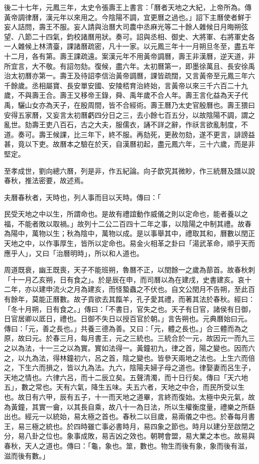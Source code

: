 \begin{pinyinscope}
後二十七年，元鳳三年，太史令張壽王上書言：「曆者天地之大紀，上帝所為。傳黃帝調律曆，漢元年以來用之。今陰陽不調，宜更曆之過也。」詔下主曆使者鮮于妄人詰問，壽王不服。妄人請與治曆大司農中丞麻光等二十餘人雜候日月晦朔弦望、八節二十四氣，鈞校諸曆用狀。奏可。詔與丞相、御史、大將軍、右將軍史各一人雜候上林清臺，課諸曆疏密，凡十一家。以元鳳三年十一月朔旦冬至，盡五年十二月，各有第。壽王課疏遠。案漢元年不用黃帝調曆，壽王非漢曆，逆天道，非所宜言，大不敬。有詔勿劾。復候，盡六年。太初曆第一，即墨徐萬且、長安徐禹治太初曆亦第一。壽王及待詔李信治黃帝調曆，課皆疏闊，又言黃帝至元鳳三年六千餘歲。丞相屬寶、長安單安國、安陵桮育治終始，言黃帝以來三千六百二十九歲，不與壽王合。壽王又移帝王錄，舜、禹年歲不合人年。壽王言化益為天子代禹，驪山女亦為天子，在殷周間，皆不合經術。壽王曆乃太史官殷曆也。壽王猥曰安得五家曆，又妄言太初曆虧四分日之三，去小餘七百五分，以故陰陽不調，謂之亂世。劾壽王吏八百石，古之大夫，服儒衣，誦不詳之辭，作祅言欲亂制度，不道。奏可。壽王候課，比三年下，終不服。再劾死，更赦勿劾，遂不更言，誹謗益甚，竟以下吏。故曆本之驗在於天，自漢曆初起，盡元鳳六年，三十六歲，而是非堅定。

至孝成世，劉向總六曆，列是非，作五紀論。向子歆究其微眇，作三統曆及譜以說春秋，推法密要，故述焉。

夫曆春秋者，天時也，列人事而目以天時。傳曰：「

民受天地之中以生，所謂命也。是故有禮誼動作威儀之則以定命也，能者養以之福，不能者敗以取禍。」故列十二公二百四十二年之事，以陰陽之中制其禮。故春為陽中，萬物以生；秋為陰中，萬物以成。是以事舉其中，禮取其和，曆數以閏正天地之中，以作事厚生，皆所以定命也。易金火相革之卦曰「湯武革命，順乎天而應乎人」，又曰「治曆明時」，所以和人道也。

周道既衰，幽王既喪，天子不能班朔，魯曆不正，以閏餘一之歲為蔀首。故春秋刺「十一月乙亥朔，日有食之」。於是辰在申，而司曆以為在建戌，史書建亥。哀十二年，亦以建申流火之月為建亥，而怪蟄蟲之不伏也。自文公閏月不告朔，至此百有餘年，莫能正曆數。故子貢欲去其餼羊，孔子愛其禮，而著其法於春秋。經曰：「冬十月朔，日有食之。」傳曰：「不書日，官失之也。天子有日官，諸侯有日御，日官居卿以厎日，禮也。日御不失日以授百官於朝。」言告朔也。元典曆始曰元。傳曰：「元，善之長也。」共養三德為善。又曰：「元，體之長也。」合三體而為之原，故曰元。於春三月，每月書王，元之三統也。三統合於一元，故因元一而九三之以為法，十一三之以為實。實如法得一。黃鐘初九，律之首，陽之變也。因而六之，以九為法，得林鐘初六，呂之首，陰之變也。皆參天兩地之法也。上生六而倍之，下生六而損之，皆以九為法。九六，陰陽夫婦子母之道也。律娶妻而呂生子，天地之情也。六律六呂，而十二辰立矣。五聲清濁，而十日行矣。傳曰「天六地五」，數之常也。天有六氣，降生五味。夫五六者，天地之中合，而民所受以生也。故日有六甲，辰有五子，十一而天地之道畢，言終而復始。太極中央元氣，故為黃鐘，其實一龠，以其長自乘，故八十一為日法，所以生權衡度量，禮樂之所繇出也。經元一以統始，易太極之首也。春秋二以目歲，易兩儀之中也。於春每月書王，易三極之統也。於四時雖亡事必書時月，易四象之節也。時月以建分至啟閉之分，易八卦之位也。象事成敗，易吉凶之效也。朝聘會盟，易大業之本也。故易與春秋，天人之道也。傳曰：「龜，象也。筮，數也。物生而後有象，象而後有滋，滋而後有數。」


\end{pinyinscope}
